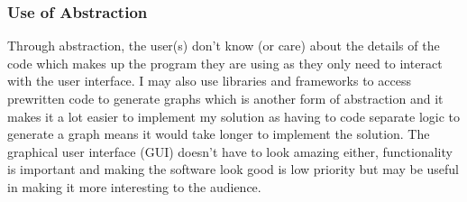 \documentclass{article}
\begin{document}
\subsubsection{Use of Abstraction}
Through abstraction, the user(s) don't know (or care) about the details of the code which makes up the program they are using as they only need to interact with the user interface. I may also use libraries and frameworks to access prewritten code to generate graphs which is another form of abstraction and it makes it a lot easier to implement my solution as having to code separate logic to generate a graph means it would take longer to implement the solution. The graphical user interface (GUI) doesn't have to look amazing either, functionality is important and making the software look good is low priority but may be useful in making it more interesting to the audience.
\end{document}
